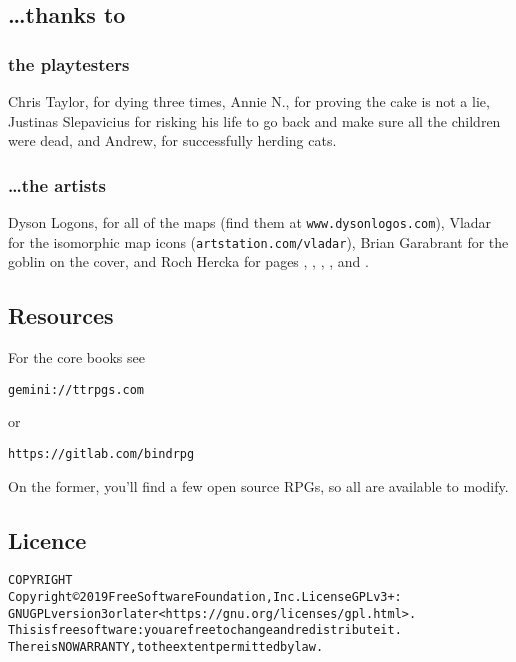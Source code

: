 \vspace{3cm}

\begin{multicols}{2}

\subsection*{\ldots thanks to}
\subsubsection*{the playtesters}
Chris Taylor, for dying three times,
Annie N., for proving the cake is not a lie,
Justinas Slepavicius for risking his life to go back and make sure all the children were dead,
and Andrew, for successfully herding cats.

\subsubsection*{\ldots the artists}

Dyson Logons, for all of the maps (find them at {\tt www.dysonlogos.com}),
\iftoggle{hardcore}{%
Daniel F. Walthall for the flat dungeon icon images in the Alchemist's tower,
}{}%
Vladar for the isomorphic map icons ({\tt artstation.com/vladar}),
Brian Garabrant for the goblin on the cover,
and Roch Hercka for pages \pageref{roch:transformation}, \pageref{roch:waking}, \pageref{roch:dragon}, \pageref{roch:garden}, and \pageref{roch:ogres}.

\columnbreak

\subsection{Resources}

For the core books see 

\begin{alltt} gemini://ttrpgs.com \end{alltt} 
or 
\begin{alltt} https://gitlab.com/bindrpg \end{alltt}
On the former, you'll find a few open source RPGs, so all are available to modify.

\end{multicols}

\subsection*{Licence}

\begin{alltt}
COPYRIGHT
       Copyright \copyright 2019 Free Software Foundation, Inc.  License GPLv3+:
	GNU GPL version 3 or later <https://gnu.org/licenses/gpl.html>.
       This is free software: you are free to change and redistribute it.
	There is NO WARRANTY, to the extent permitted by law.

\end{alltt}

